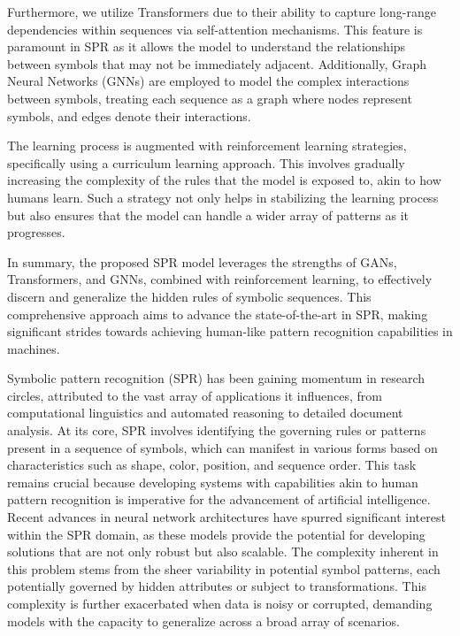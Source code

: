 \documentclass{article}
\begin{document}
Furthermore, we utilize Transformers due to their ability to capture long-range dependencies within sequences via self-attention mechanisms. This feature is paramount in SPR as it allows the model to understand the relationships between symbols that may not be immediately adjacent. Additionally, Graph Neural Networks (GNNs) are employed to model the complex interactions between symbols, treating each sequence as a graph where nodes represent symbols, and edges denote their interactions.

The learning process is augmented with reinforcement learning strategies, specifically using a curriculum learning approach. This involves gradually increasing the complexity of the rules that the model is exposed to, akin to how humans learn. Such a strategy not only helps in stabilizing the learning process but also ensures that the model can handle a wider array of patterns as it progresses.

In summary, the proposed SPR model leverages the strengths of GANs, Transformers, and GNNs, combined with reinforcement learning, to effectively discern and generalize the hidden rules of symbolic sequences. This comprehensive approach aims to advance the state-of-the-art in SPR, making significant strides towards achieving human-like pattern recognition capabilities in machines.

Symbolic pattern recognition (SPR) has been gaining momentum in research circles, attributed to the vast array of applications it influences, from computational linguistics and automated reasoning to detailed document analysis. At its core, SPR involves identifying the governing rules or patterns present in a sequence of symbols, which can manifest in various forms based on characteristics such as shape, color, position, and sequence order. This task remains crucial because developing systems with capabilities akin to human pattern recognition is imperative for the advancement of artificial intelligence. Recent advances in neural network architectures have spurred significant interest within the SPR domain, as these models provide the potential for developing solutions that are not only robust but also scalable. The complexity inherent in this problem stems from the sheer variability in potential symbol patterns, each potentially governed by hidden attributes or subject to transformations. This complexity is further exacerbated when data is noisy or corrupted, demanding models with the capacity to generalize across a broad array of scenarios.
\end{document}
